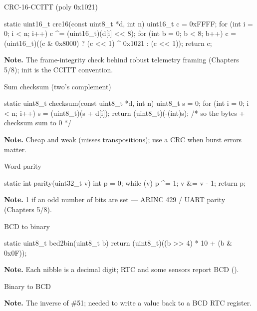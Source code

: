 \begin{gymproblem}{CRC-16-CCITT (poly 0x1021)}
\begin{cgym}
static uint16_t crc16(const uint8_t *d, int n) {
    uint16_t c = 0xFFFF;
    for (int i = 0; i < n; i++) {
        c ^= (uint16_t)(d[i] << 8);
        for (int b = 0; b < 8; b++) c = (uint16_t)((c & 0x8000) ? (c << 1) ^ 0x1021 : (c << 1));
    }
    return c;
}
\end{cgym}
\textbf{Note.} The frame-integrity check behind robust telemetry framing
(Chapters 5/8); init  is the CCITT convention.
\end{gymproblem}

\begin{gymproblem}{Sum checksum (two's complement)}
\begin{cgym}
static uint8_t checksum(const uint8_t *d, int n) {
    uint8_t s = 0;
    for (int i = 0; i < n; i++) s = (uint8_t)(s + d[i]);
    return (uint8_t)(-(int)s);   /* so the bytes + checksum sum to 0 */
}
\end{cgym}
\textbf{Note.} Cheap and weak (misses transpositions); use a CRC when burst
errors matter.
\end{gymproblem}

\begin{gymproblem}{Word parity}
\begin{cgym}
static int parity(uint32_t v) { int p = 0; while (v) { p ^= 1; v &= v - 1; } return p; }
\end{cgym}
\textbf{Note.} 1 if an odd number of bits are set --- ARINC 429 / UART parity
(Chapters 5/8).
\end{gymproblem}

\begin{gymproblem}{BCD to binary}
\begin{cgym}
static uint8_t bcd2bin(uint8_t b) { return (uint8_t)((b >> 4) * 10 + (b & 0x0F)); }
\end{cgym}
\textbf{Note.} Each nibble is a decimal digit; RTC and some sensors report BCD
().
\end{gymproblem}

\begin{gymproblem}{Binary to BCD}
\textbf{Note.} The inverse of \#51; needed to write a value back to a BCD RTC
register.
\end{gymproblem}

